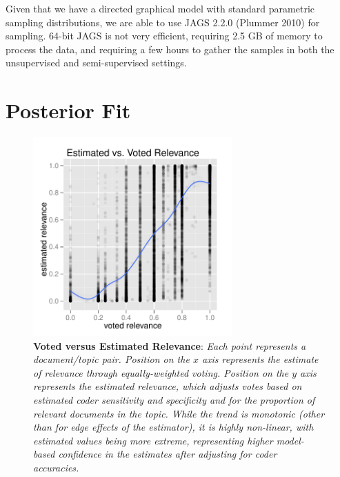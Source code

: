 \documentclass{article}
\begin{document}
Given that we have a directed graphical model with standard parametric
sampling distributions, we are able to use JAGS 2.2.0 (Plummer 2010)
for sampling.  64-bit JAGS is not very efficient, requiring 2.5
GB of memory to process the data, and requiring a few hours to gather
the samples in both the unsupervised and semi-supervised settings.


\section{Posterior Fit}

\begin{figure}
\begin{center}
\includegraphics[height=3.0in]{img/vote_vs_estimate.pdf}
\parbox{5in}{\caption{\small {\bf Voted versus Estimated Relevance}: {\it Each point
represents a document/topic pair.  Position on the $x$ axis represents
the estimate of relevance through equally-weighted voting.  Position
on the $y$ axis represents the estimated relevance, which adjusts
votes based on estimated coder sensitivity and specificity and for the
proportion of relevant documents in the topic.  While the trend is
monotonic (other than for edge effects of the estimator), it is highly
non-linear, with estimated values being more extreme, representing
higher model-based confidence in the estimates after adjusting for
coder accuracies.}}\label{vote_vs_estimate.fig}}
\end{center}
\end{figure}
%
\end{document}
